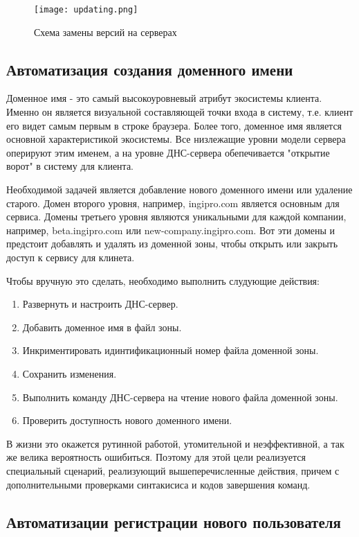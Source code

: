 \begin{figure}[H]
\centering
\texttt{[image: updating.png]}
\caption{Схема замены версий на серверах}
\label{img:updating}
\end{figure} 


\subsection{Автоматизация создания доменного имени}

Доменное имя - это самый высокоуровневый атрибут экосистемы клиента. Именно он является визуальной составляющей точки входа в систему, т.е. клиент его видет самым первым в строке браузера. Более того, доменное имя является основной характеристикой экосистемы. Все низлежащие уровни модели сервера оперируют этим именем, а на уровне ДНС-сервера обепечивается "открытие ворот" в систему для клиента. 

Необходимой задачей является добавление нового доменного имени или удаление старого. Домен второго уровня, например, {\ttfamily ingipro.com} является основным для сервиса. Домены третьего уровня являются уникальными для каждой компании, например, {\ttfamily beta.ingipro.com} или {\ttfamily new-company.ingipro.com}. Вот эти домены и предстоит добавлять и удалять из доменной зоны, чтобы открыть или закрыть доступ к сервису для клинета.

Чтобы вручную это сделать, необходимо выполнить слудующие действия:
\begin{enumerate}
	\item Развернуть и настроить ДНС-сервер.
	\item Добавить доменное имя в файл зоны.
	\item Инкриментировать идинтификационный номер файла доменной зоны.
	\item Сохранить изменения.
	\item Выполнить команду ДНС-сервера на чтение нового файла доменной зоны.
	\item Проверить доступность нового доменного имени.
\end{enumerate}
В жизни это окажется рутинной работой, утомительной и неэффективной, а так же велика вероятность ошибиться. Поэтому для этой цели реализуется специальный сценарий, реализующий вышеперечисленные действия, причем с дополнительными проверками синтакисиса и кодов завершения команд.


\subsection{Автоматизации регистрации нового пользователя}

